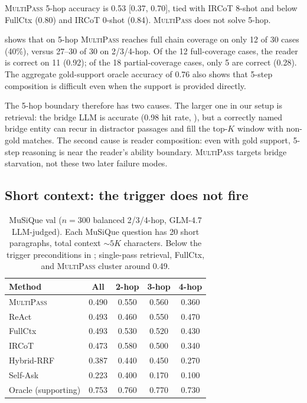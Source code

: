 \documentclass{article}
\theoremstyle{plain}
\theoremstyle{definition}
\newcommand{\ours}{\textsc{MultiPass}}
\begin{document}
\ours{} 5-hop accuracy is 0.53 [0.37, 0.70], tied with IRCoT 8-shot and
below FullCtx (0.80) and IRCoT 0-shot (0.84). \ours{} does not solve 5-hop.

 shows that on 5-hop \ours{} reaches full chain
coverage on only 12 of 30 cases (40\%), versus 27--30 of 30 on 2/3/4-hop.
Of the 12 full-coverage cases, the reader is correct on 11 (0.92); of the
18 partial-coverage cases, only 5 are correct (0.28). The aggregate
gold-support oracle accuracy of 0.76 also shows that 5-step composition is
difficult even when the support is provided directly.

The 5-hop boundary therefore has two causes. The larger one in our setup
is retrieval: the bridge LLM is accurate (0.98 hit rate, ),
but a correctly named bridge entity can recur in distractor passages and
fill the top-$K$ window with non-gold matches. The second cause is reader
composition: even with gold support, 5-step reasoning is near the reader's
ability boundary. \ours{} targets bridge starvation, not these two later
failure modes.

\subsection{Short context: the trigger does not fire}\label{sec:musique}

\begin{table}[t]
\centering
\caption{MuSiQue val ($n{=}300$ balanced 2/3/4-hop, GLM-4.7 LLM-judged).
Each MuSiQue question has 20 short paragraphs, total context ${\sim}5K$
characters. Below the trigger preconditions in ;
single-pass retrieval, FullCtx, and \ours{} cluster around 0.49.}
\label{tab:musique}
\small
\begin{tabular}{@{}lcccc@{}}
\toprule
Method & All & 2-hop & 3-hop & 4-hop \\
\midrule
\ours{} & 0.490 & 0.550 & 0.560 & 0.360 \\
ReAct & 0.493 & 0.460 & 0.550 & 0.470 \\
FullCtx & 0.493 & 0.530 & 0.520 & 0.430 \\
IRCoT & 0.473 & 0.580 & 0.500 & 0.340 \\
Hybrid-RRF & 0.387 & 0.440 & 0.450 & 0.270 \\
Self-Ask & 0.223 & 0.400 & 0.170 & 0.100 \\
Oracle (supporting) & 0.753 & 0.760 & 0.770 & 0.730 \\
\bottomrule
\end{tabular}
\end{table}
\end{document}
